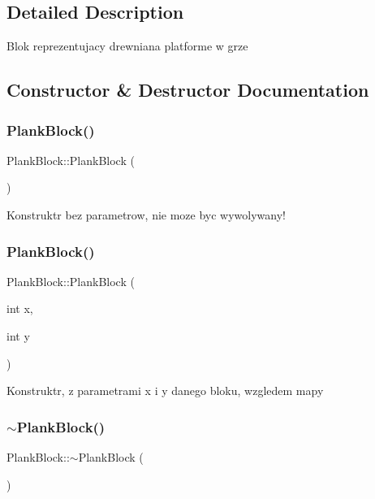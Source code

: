 \subsection{Detailed Description}
Blok reprezentujacy drewniana platforme w grze 

\subsection{Constructor \& Destructor Documentation}
\mbox{\label{class_plank_block_af0a7e46056468e24b74c0aca475533b9}} 
\subsubsection{\texorpdfstring{Plank\+Block()}{PlankBlock()}\hspace{0.1cm}{\footnotesize\ttfamily [1/2]}}
{\footnotesize\ttfamily Plank\+Block\+::\+Plank\+Block (\begin{DoxyParamCaption}{ }\end{DoxyParamCaption})}

Konstruktr bez parametrow, nie moze byc wywolywany! \mbox{\label{class_plank_block_afed7c0965c7e1e4b9ec98a4ff06825df}} 
\subsubsection{\texorpdfstring{Plank\+Block()}{PlankBlock()}\hspace{0.1cm}{\footnotesize\ttfamily [2/2]}}
{\footnotesize\ttfamily Plank\+Block\+::\+Plank\+Block (\begin{DoxyParamCaption}\item[{int}]{x,  }\item[{int}]{y }\end{DoxyParamCaption})}

Konstruktr, z parametrami x i y danego bloku, wzgledem mapy \mbox{\label{class_plank_block_afbd822caf201cd34777e46addb7f50c8}} 
\subsubsection{\texorpdfstring{$\sim$\+Plank\+Block()}{~PlankBlock()}}
{\footnotesize\ttfamily Plank\+Block\+::$\sim$\+Plank\+Block (\begin{DoxyParamCaption}{ }\end{DoxyParamCaption})}

